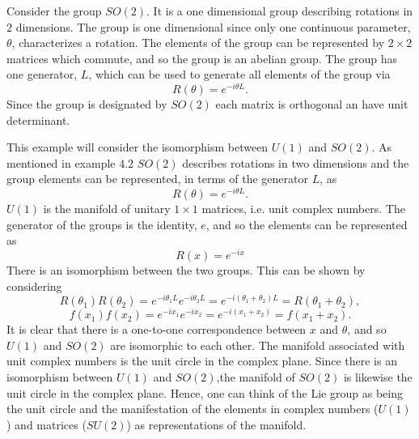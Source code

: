 \begin{example}
	Consider the group $SO(2)$. It is a one dimensional group describing rotations in $2$ dimensions. The group is one dimensional since only one continuous parameter, $\theta$, characterizes a rotation. The elements of the group can be represented by $2\times 2$ matrices which commute, and so the group is an abelian group. The group has one generator, $L$, which can be used to generate all elements of the group via
	\begin{equation}
		R(\theta)=e^{-i\theta L}.
	\end{equation} 
	Since the group is designated by $SO(2)$ each matrix is orthogonal an have unit determinant. 
\end{example}
\begin{example}
	This example will consider the isomorphism between $U(1)$ and $SO(2)$. As mentioned in example $4.2$ $SO(2)$ describes rotations in two dimensions and the group elements can be represented, in terms of the generator $L$, as
	\begin{equation}
		R(\theta)=e^{-i\theta L}.
	\end{equation} 
	$U(1)$ is the manifold of unitary $1\times 1$ matrices, i.e. unit complex numbers. The generator of the groups is the identity, $e$, and so the elements can be represented as
	\begin{equation}
		R(x)=e^{-ix}
	\end{equation} 
	There is an isomorphism between the two groups. This can be shown by considering
	\begin{equation}
		R(\theta_1)R(\theta_2)=e^{-i\theta_1 L}e^{-i\theta_2 L}=e^{-i(\theta_1+\theta_2) L}=R(\theta_1+\theta_2),
	\end{equation} 
	\begin{equation}
		f(x_1)f(x_2)=e^{-ix_1}e^{-ix_2}=e^{-i(x_1+x_2)}=f(x_1+x_2).
	\end{equation} 
	It is clear that there is a one-to-one correspondence between $x$ and $\theta$, and so $U(1)$ and $SO(2)$ are isomorphic to each other. The manifold associated with unit complex numbers is the unit circle in the complex plane. Since there is an isomorphism between $U(1)$ and $SO(2)$,the manifold of $SO(2)$ is likewise the unit circle in the complex plane. Hence, one can think of the Lie group as being the unit circle and the manifestation of the elements in complex numbers ($U(1)$) and matrices ($SU(2)$) as representations of the manifold. 
\end{example}


